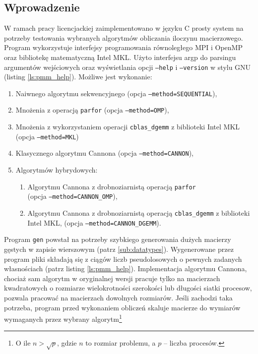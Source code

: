 \subsection{Wprowadzenie}
W ramach pracy licencjackiej zaimplementowano w języku C prosty system na potrzeby testowania wybranych algorytmów obliczania iloczynu macierzowego. Program wykorzystuje interfejsy programowania równoległego MPI i OpenMP oraz bibliotekę matematyczną Intel MKL. Użyto interfejsu argp do parsingu argumentów wejściowych oraz wyświetlania opcji \texttt{--help} i \texttt{--version} w stylu GNU (listing \ref{ls:pmm_help}). Możliwe jest wykonanie:
\begin{enumerate}
\item Naiwnego algorytmu sekwencyjnego (opcja \texttt{--method=SEQUENTIAL}),
\item Mnożenia z operacją \texttt{parfor} (opcja \texttt{--method=OMP}),
\item Mnożenia z wykorzystaniem operacji \texttt{cblas\_dgemm} z biblioteki Intel MKL (opcja \texttt{--method=MKL})
\item Klasycznego algorytmu Cannona (opcja \texttt{--method=CANNON}),
\item Algorytmów hybrydowych:
\begin{enumerate}
\item Algorytmu Cannona z drobnoziarnistą operacją \texttt{parfor} \\ (opcja \texttt{--method=CANNON\_OMP}), 
\item Algorytmu Cannona z drobnoziarnistą operacją \texttt{cblas\_dgemm} z biblioteki Intel MKL, (opcja \texttt{--method=CANNON\_DGEMM}).
\end{enumerate}
\end{enumerate}

Program \texttt{gen} powstał na potrzeby szybkiego generowania dużych macierzy gęstych w zapisie wierszowym (patrz \ref{sub:datatypes}). Wygenerowane przez program pliki składają się z ciągów liczb pseudolosowych o pewnych zadanych własnościach (patrz listing \ref{ls:pmm_help}). 
Implementacja algorytmu Cannona, chociaż sam algorytm w oryginalnej wersji pracuje tylko na macierzach kwadratowych o rozmiarze wielokrotności szerokości lub długości siatki procesow, pozwala pracować na macierzach dowolnych rozmiarów. Jeśli zachodzi taka potrzeba, program przed wykonaniem obliczeń skaluje macierze do wymiarów wymaganych przez wybrany algorytm\footnote{O ile \(n>\sqrt{p}\), gdzie \(n\) to rozmiar problemu, a \(p\) -- liczba procesów.}


